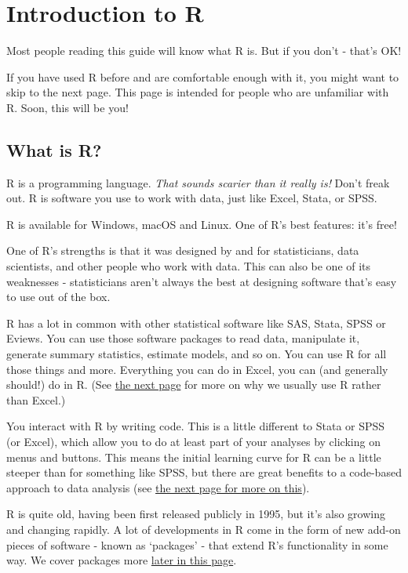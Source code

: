 \documentclass[
]{book}
\begin{document}
\hypertarget{introduction-to-r}{%
\chapter{Introduction to R}\label{introduction-to-r}}

Most people reading this guide will know what R is. But if you don't - that's OK!

If you have used R before and are comfortable enough with it, you might want to skip to the next page. This page is intended for people who are unfamiliar with R. Soon, this will be you!

\hypertarget{what-is-r}{%
\section{What is R?}\label{what-is-r}}

R is a programming language. \emph{That sounds scarier than it really is!} Don't freak out. R is software you use to work with data, just like Excel, Stata, or SPSS.

R is available for Windows, macOS and Linux. One of R's best features: it's free!

One of R's strengths is that it was designed by and for statisticians, data scientists, and other people who work with data. This can also be one of its weaknesses - statisticians aren't always the best at designing software that's easy to use out of the box.

R has a lot in common with other statistical software like SAS, Stata, SPSS or Eviews. You can use those software packages to read data, manipulate it, generate summary statistics, estimate models, and so on. You can use R for all those things and more. Everything you can do in Excel, you can (and generally should!) do in R. (See \protect\hyperlink{why-script}{the next page} for more on why we usually use R rather than Excel.)

You interact with R by writing code. This is a little different to Stata or SPSS (or Excel), which allow you to do at least part of your analyses by clicking on menus and buttons. This means the initial learning curve for R can be a little steeper than for something like SPSS, but there are great benefits to a code-based approach to data analysis (see \protect\hyperlink{why-script}{the next page for more on this}).

R is quite old, having been first released publicly in 1995, but it's also growing and changing rapidly. A lot of developments in R come in the form of new add-on pieces of software - known as `packages' - that extend R's functionality in some way. We cover packages more \protect\hyperlink{packages}{later in this page}.
\end{document}
